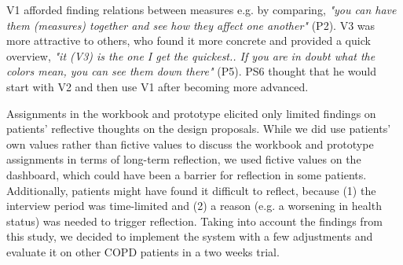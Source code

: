 V1 afforded finding relations between measures e.g. by comparing, \textit{"you can have them (measures) together and see how they affect one another"} (P2). V3 was more attractive to others, who found it more concrete and provided a quick overview, \textit{"it (V3) is the one I get the quickest.. If you are in doubt what the colors mean, you can see them down there"} (P5). PS6 thought that he would start with V2 and then use V1 after becoming more advanced. 

Assignments in the workbook and prototype elicited only limited findings on patients' reflective thoughts on the design proposals. While we did use patients' own values rather than fictive values to discuss the workbook and prototype assignments in terms of long-term reflection, we used fictive values on the dashboard, which could have been a barrier for reflection in some patients. Additionally, patients might have found it difficult to reflect, because (1) the interview period was time-limited and (2) a reason (e.g. a worsening in health status) was needed to trigger reflection. Taking into account the findings from this study, we decided to implement the system with a few adjustments and evaluate it on other COPD patients in a two weeks trial. 